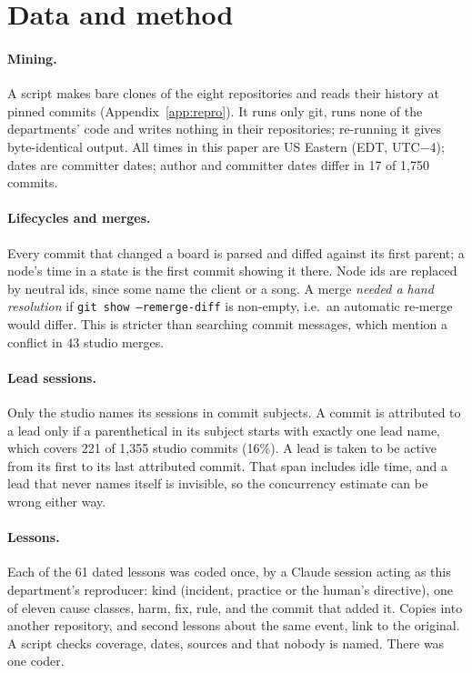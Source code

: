\documentclass[11pt]{article}
\newcommand{\code}[1]{\texttt{#1}}
\begin{document}
\section{Data and method}\label{sec:method}

\paragraph{Mining.}
A script makes bare clones of the eight repositories and reads their history at pinned
commits (Appendix~\ref{app:repro}). It runs only git, runs none of the departments' code
and writes nothing in their repositories; re-running it gives byte-identical output.
All times in this paper are US Eastern (EDT, UTC$-$4); dates are committer dates; author and committer dates differ in 17 of %
1,750 commits.

\paragraph{Lifecycles and merges.}
Every commit that changed a board is parsed and diffed against its first parent; a node's
time in a state is the first commit showing it there. Node ids are replaced by neutral
ids, since some name the client or a song. A merge \emph{needed a hand resolution} if
\code{git show --remerge-diff} is non-empty, i.e.\ an automatic re-merge would differ.
This is stricter than searching commit messages, which mention a conflict in 43 studio %
merges.

\paragraph{Lead sessions.}
Only the studio names its sessions in commit subjects. A commit is attributed to a lead
only if a parenthetical in its subject starts with exactly one lead name, which covers 221 %
of 1,355 studio commits (16\%). A lead is taken to be active from its first to its last
attributed commit. That span includes idle time, and a lead that never names itself is
invisible, so the concurrency estimate can be wrong either way.

\paragraph{Lessons.}
Each of the 61 dated lessons was coded once, by a Claude session acting as this %
department's reproducer: kind (incident, practice or the human's directive), one of eleven
cause classes, harm, fix, rule, and the commit that added it. Copies into another
repository, and second lessons about the same event, link to the original. A script
checks coverage, dates, sources and that nobody is named. There was one coder.
\end{document}
